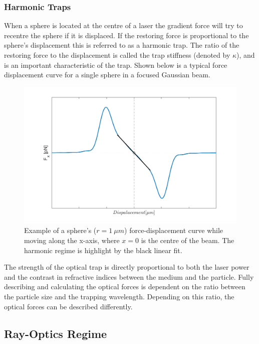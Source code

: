 \subsubsection{Harmonic Traps}
\label{sec:harmonic_traps}
When a sphere is located at the centre of a laser the gradient force
will try to recentre the sphere if it is displaced. If the restoring 
force is proportional to the sphere's displacement this is referred 
to as a harmonic trap. The ratio of the restoring force to the 
displacement is called the trap stiffness (denoted by $\kappa$), and 
is an important characteristic of the trap. Shown below is a typical 
force displacement curve for a single sphere in a focused Gaussian beam. 
\begin{figure}[h!]
	\centering
	\includegraphics[width=\linewidth]{sphere_force_curve.png}
	\caption{Example of a sphere's ($r=1\ \mu m$) force-displacement curve 
			while moving along the x-axis, where $x=0$ is the centre of the
			beam. The harmonic regime is highlight by the black linear fit.}
	\label{fig:harmonic_trap}
\end{figure}

The strength of the optical trap is directly proportional to both 
the laser power and the contrast in refractive indices between the 
medium and the particle. Fully describing and calculating the 
optical forces is dependent on the ratio between the particle size 
and the trapping wavelength. Depending on this ratio, the optical 
forces can be described differently.
\subsection{Ray-Optics Regime}


